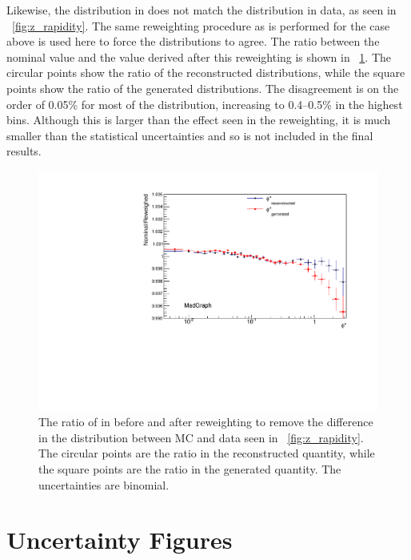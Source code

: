 Likewise, the \Z \rapidity distribution in \MADGRAPH does not match the
distribution in data, as seen in \FIG~\ref{fig:z_rapidity}. The same
reweighting procedure as is performed for the \mee case above is used here to
force the distributions to agree. The ratio between the nominal \phistar value
and the value derived after this reweighting is shown in
\FIG~\ref{fig:z_mass_reweighted}.
The circular points show the ratio of the
reconstructed \phistar distributions, while the square points show the ratio of
the generated \phistar distributions. The disagreement is on the order of
0.05\% for most of the distribution, increasing to 0.4--0.5\% in the highest
\phistar bins. Although this is larger than the effect seen in the \mee
reweighting, it is much smaller than the statistical uncertainties and so is
not included in the final results.

\begin{figure}[!htbp]
    \centering
    \includegraphics[width=\textwidth]{figures/ZY_reweighed.pdf}
    \caption[
        The ratio of \phistar in \MADGRAPH before and after reweighting to
        remove the differnce in the \rapidity distribution between MC and data.
    ]{
        The ratio of \phistar in \MADGRAPH before and after reweighting to
        remove the difference in the \rapidity distribution between MC and data
        seen in \FIG~\ref{fig:z_rapidity}. The circular points are the ratio in
        the reconstructed quantity, while the square points are the ratio in
        the generated quantity. The uncertainties are binomial.
    }
    \label{fig:z_mass_reweighted}
\end{figure}

\section{Uncertainty Figures}

